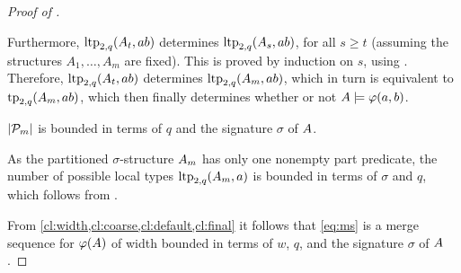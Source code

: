 \begin{proof}[Proof of ]
\begin{claimproof}
    
Furthermore, $\ltp_{2,q}(\str A_t,ab)$ determines $\ltp_{2,q}(\str A_s,ab)$, for all $s\ge t$ (assuming the structures $A_1,\ldots,A_m$ are fixed).
This is proved by induction on $s$, using . Therefore, $\ltp_{2,q}(\str A_t,ab)$ determines $\ltp_{2,q}(\str A_m,ab)$,
which in turn is equivalent to $\tp_{2,q}(\str A_m,ab)$, which then finally determines whether or not $\str A\models\phi(a,b)$.
  \end{claimproof}

  \begin{claim}\label{cl:final}
     $|\cal P_m|$ is bounded in terms of $q$ and the signature $\sigma$ of $\str A$.
  \end{claim}
  \begin{claimproof}
    As the partitioned $\sigma$-structure $\str A_m$ has only one nonempty part predicate, 
    the number of possible local types $\ltp_{2,q}(\str A_m,a)$ is bounded in terms 
    of $\sigma$ and $q$, which follows from .
  \end{claimproof}

  From \cref{cl:width,cl:coarse,cl:default,cl:final}
  it follows
  that \eqref{eq:ms}
  is a merge sequence for $\phi(\str A)$ of width bounded in terms of $w$, $q$, and the signature $\sigma$ of $\str A$.
\end{proof}

